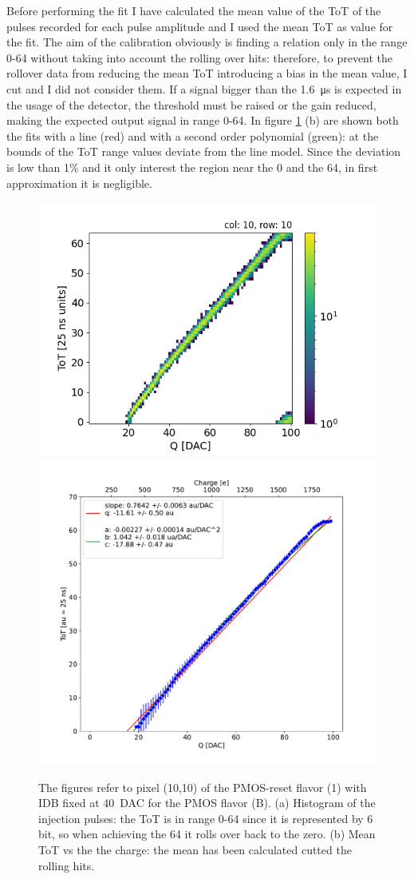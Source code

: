         Before performing the fit I have calculated the mean value of the ToT of the pulses recorded for each pulse amplitude and I used the mean ToT as value for the fit. 
        The aim of the calibration obviously is finding a relation only in the range 0-64 without taking into account the rolling over hits: therefore, to prevent the rollover data from reducing the mean ToT introducing a bias in the mean value, I cut and I did not consider them. 
        If a signal bigger than the \SI{1.6}{\us} is expected in the usage of the detector, the threshold must be raised or the gain reduced, making the expected output signal in range 0-64. 
        In figure \ref{fig:ToT_vs_charge} (b) are shown both the fits with a line (red) and with a second order polynomial (green): at the bounds of the ToT range values deviate from the line model. Since the deviation is low than 1\% and it only interest the region near the 0 and the 64, in first approximation it is negligible. 
        
        \begin{figure}[h!]
            \centering
            \includegraphics[width=.49\linewidth]{figures/charaterization/ToT_rollover.png}            
            \includegraphics[width=.49\linewidth]{figures/charaterization/ToT_injection.pdf}
            \label{fig:ToT_vs_charge}
            \caption{The figures refer to pixel (10,10) of the PMOS-reset flavor (1) with IDB fixed at \SI{40}{DAC} for the PMOS flavor (B).
            (a) Histogram of the injection pulses: the ToT is in range 0-64 since it is represented by 6 bit, so when achieving the 64 it rolls over back to the zero. (b) Mean ToT vs the the charge: the mean has been calculated cutted the rolling hits. }
        \end{figure}    

